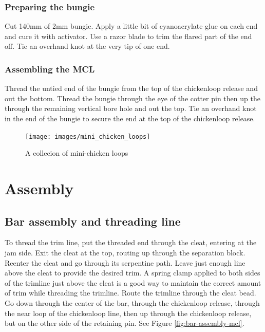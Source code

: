 \documentclass[
]{book}
\begin{document}
\hypertarget{preparing-the-bungie}{%
\subsection{Preparing the bungie}\label{preparing-the-bungie}}

Cut 140mm of 2mm bungie. Apply a little bit of cyanoacrylate glue on each end and cure it with activator. Use a razor blade to trim the flared part of the end off. Tie an overhand knot at the very tip of one end.

\hypertarget{assembling-the-mcl}{%
\subsection{Assembling the MCL}\label{assembling-the-mcl}}

Thread the untied end of the bungie from the top of the chickenloop release and out the bottom. Thread the bungie through the eye of the cotter pin then up the through the remaining vertical bore hole and out the top. Tie an overhand knot in the end of the bungie to secure the end at the top of the chickenloop release.

\begin{figure}

{\centering \texttt{[image: images/mini\_chicken\_loops]} 

}

\caption{A collecion of mini-chicken loops}\label{fig:collection-of-mcls}
\end{figure}

\hypertarget{assembly}{%
\chapter{Assembly}\label{assembly}}

\hypertarget{bar-assembly-and-threading-line}{%
\section{Bar assembly and threading line}\label{bar-assembly-and-threading-line}}

To thread the trim line, put the threaded end through the cleat, entering at the jam side. Exit the cleat at the top, routing up through the separation block. Reenter the cleat and go through its serpentine path. Leave just enough line above the cleat to provide the desired trim. A spring clamp applied to both sides of the trimline just above the cleat is a good way to maintain the correct amount of trim while threading the trimline. Route the trimline through the cleat bead. Go down through the center of the bar, through the chickenloop release, through the near loop of the chickenloop line, then up through the chickenloop release, but on the other side of the retaining pin. See Figure \ref{fig:bar-assembly-mcl}.
\end{document}
